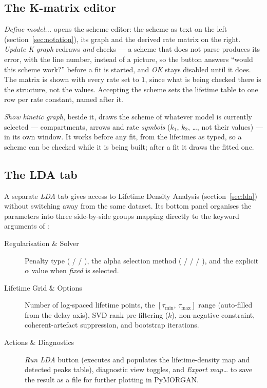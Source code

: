 \subsection{The K-matrix editor}

\emph{Define model...} opens the scheme editor: the scheme as text on the left
(section~\ref{sec:notation}), its graph and the derived rate matrix on the
right. \emph{Update K graph} redraws \emph{and} checks --- a scheme that does
not parse produces its error, with the line number, instead of a picture, so
the button answers ``would this scheme work?'' before a fit is started, and
\emph{OK} stays disabled until it does. The matrix is shown with every rate set
to $1$, since what is being checked there is the structure, not the values.
Accepting the scheme sets the lifetime table to one row per rate constant,
named after it.

\emph{Show kinetic graph}, beside it, draws the scheme of whatever model is
currently selected --- compartments, arrows and rate \emph{symbols}
($k_1$, $k_2$, \dots, not their values) --- in its own window. It works before
any fit, from the lifetimes as typed, so a scheme can be checked while it is
being built; after a fit it draws the fitted one.

\subsection{The LDA tab}

A separate \emph{LDA} tab gives access to Lifetime Density Analysis
(section~\ref{sec:lda}) without switching away from the same dataset. Its
bottom panel organises the parameters into three side-by-side groups mapping
directly to the keyword arguments of :

\begin{description}
  \item[Regularisation \& Solver] Penalty type ( /  / ),
    the alpha selection method ( /  /  / ),
    and the explicit $\alpha$ value when \emph{fixed} is selected.
  \item[Lifetime Grid \& Options] Number of log-spaced lifetime points, the
    $[\tau_\text{min},\,\tau_\text{max}]$ range (auto-filled from the delay axis),
    SVD rank pre-filtering ($k$), non-negative constraint, coherent-artefact
    suppression, and bootstrap iterations.
  \item[Actions \& Diagnostics] \emph{Run LDA} button (executes 
    and populates the lifetime-density map and detected peaks table), diagnostic
    view toggles, and \emph{Export map\ldots} to save the result as a 
    file for further plotting in PyMORGAN.
\end{description}

